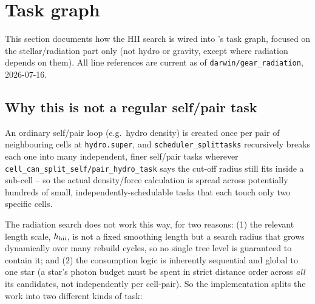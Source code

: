 \section{Task graph}
\label{sec:taskgraph}

This section documents how the HII search is wired into \swift's task
graph, focused on the stellar/radiation part only (not hydro or
gravity, except where radiation depends on them). All line references
are current as of \texttt{darwin/gear\_radiation},
2026-07-16.

\subsection{Why this is not a regular self/pair task}
\label{sec:not-regular}

An ordinary \swift self/pair loop (e.g.\ hydro density) is created once
per pair of neighbouring cells at \texttt{hydro.super}, and
\texttt{scheduler\_splittasks} recursively breaks each one into many
independent, finer self/pair tasks wherever
\texttt{cell\_can\_split\_self/pair\_hydro\_task} says the cut-off
radius still fits inside a sub-cell -- so the actual density/force
calculation is spread across potentially hundreds of small,
independently-schedulable tasks that each touch only two specific
cells.

The radiation search does not work this way, for two reasons: (1) the
relevant length scale, $h_{\rm hii}$, is not a fixed smoothing length
but a search radius that grows dynamically over many rebuild cycles,
so no single tree level is guaranteed to contain it; and (2) the
consumption logic is inherently sequential and global to one star (a
star's photon budget must be spent in strict distance order across
\emph{all} its candidates, not independently per cell-pair). So the
implementation splits the work into two different kinds of task:

